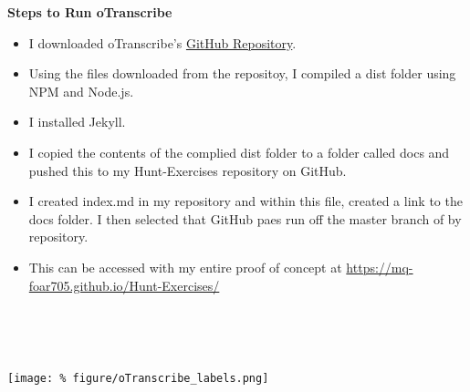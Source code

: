 \documentclass[unknownkeysallowed,usepdftitle=false, parskip=full]{beamer}
\newcommand{\secvariable}{nothing}
\newcommand{\mysection}[1]{\renewcommand{\secvariable}{#1}
}
\begin{document}
\mysection{radar}
\begin{frame}\label{\secvariable}
  
\textbf{Steps to Run oTranscribe}

\begin{itemize}
   \item I downloaded oTranscribe's \href{https://github.com/oTranscribe/oTranscribe}{GitHub Repository}.
   \item Using the files downloaded from the repositoy, I compiled a dist folder using NPM and Node.js.
   \item I installed Jekyll.
   \item I copied the contents of the complied dist folder to a folder called docs and pushed this to my Hunt-Exercises repository on GitHub.
   \item I created index.md in my repository and within this file, created a link to the docs folder. I then selected that GitHub paes run off the master branch of by repository.
   \item This can be accessed with my entire proof of concept at \url{https://mq-foar705.github.io/Hunt-Exercises/}
\end{itemize}  
      
      \hyperlink{oTranscribe_interface}{}\\

\end{frame}

\begin{frame}\label{\secvariable}
\label{oTranscribe_interface}
\hyperlink{slab}{}\\
\begin{center}
  \vspace{-0.2cm}
 \texttt{[image: \%
  figure/oTranscribe\_labels.png]}
\end{center}
\end{frame}
\end{document}
